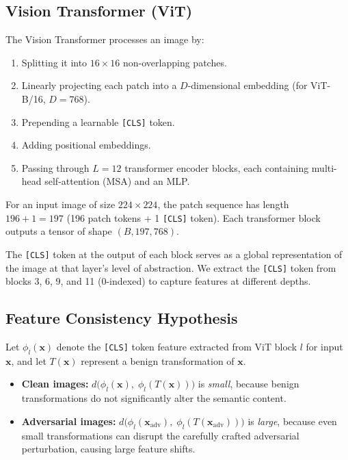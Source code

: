\documentclass[12pt, a4paper]{article}
\begin{document}
\subsection{Vision Transformer (ViT)}

The Vision Transformer \cite{dosovitskiy2021image} processes an image by:
\begin{enumerate}[nosep]
    \item Splitting it into $16 \times 16$ non-overlapping patches.
    \item Linearly projecting each patch into a $D$-dimensional embedding
          (for ViT-B/16, $D = 768$).
    \item Prepending a learnable \texttt{[CLS]} token.
    \item Adding positional embeddings.
    \item Passing through $L = 12$ transformer encoder blocks, each
          containing multi-head self-attention (MSA) and an MLP.
\end{enumerate}

For an input image of size $224 \times 224$, the patch sequence has
length $196 + 1 = 197$ (196 patch tokens + 1 \texttt{[CLS]} token). Each
transformer block outputs a tensor of shape
$(B, 197, 768)$.

The \texttt{[CLS]} token at the output of each block serves as a global
representation of the image at that layer's level of abstraction. We
extract the \texttt{[CLS]} token from blocks 3, 6, 9, and 11 (0-indexed)
to capture features at different depths.

\subsection{Feature Consistency Hypothesis}

Let $\phi_l(\mathbf{x})$ denote the \texttt{[CLS]} token feature
extracted from ViT block $l$ for input $\mathbf{x}$, and let
$T(\mathbf{x})$ represent a benign transformation of $\mathbf{x}$.

\begin{itemize}
    \item \textbf{Clean images:}
    $d\bigl(\phi_l(\mathbf{x}),\;\phi_l(T(\mathbf{x}))\bigr)$
    is \emph{small}, because benign transformations do not significantly
    alter the semantic content.

    \item \textbf{Adversarial images:}
    $d\bigl(\phi_l(\mathbf{x}_{\mathrm{adv}}),\;
    \phi_l(T(\mathbf{x}_{\mathrm{adv}}))\bigr)$
    is \emph{large}, because even small transformations can disrupt the
    carefully crafted adversarial perturbation, causing large feature
    shifts.
\end{itemize}
\end{document}
